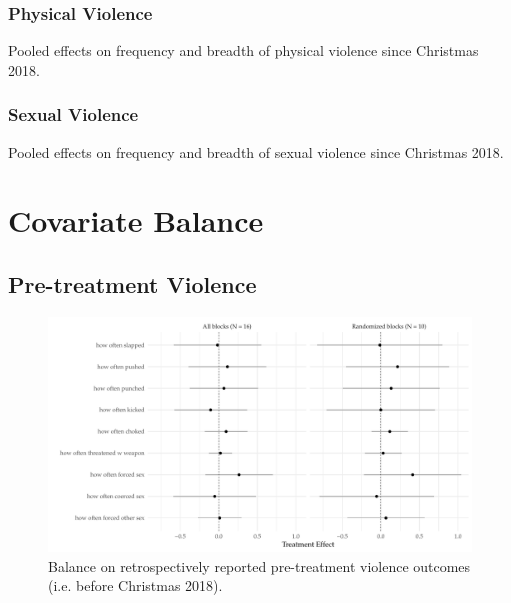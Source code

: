 \documentclass[11pt,english]{article}
\begin{document}
\subsubsection{Physical Violence}

\begin{table}[H]
\centering

\caption{Pooled effects on frequency and breadth of physical violence since Christmas 2018.}
\label{tab:physical}
\end{table}

\subsubsection{Sexual Violence}

\begin{table}[H]
\centering

\caption{Pooled effects on frequency and breadth of sexual violence since Christmas 2018.}
\label{tab:sexual}
\end{table}

\section{Covariate Balance}

\subsection{Pre-treatment Violence}

\begin{figure}[H]
\centering
\includegraphics[width = \textwidth]{figures/subitem_balance_plot.pdf}
\caption{Balance on retrospectively reported pre-treatment violence outcomes (i.e. before Christmas 2018).}
\label{fig:subitem_balance_plot}
\end{figure}
\end{document}
